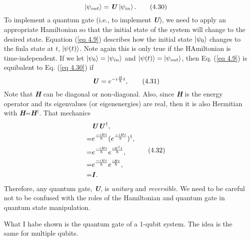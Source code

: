 \documentclass{article}
\begin{document}
\begin{equation} \label{eq 4.30}
    \ket{\psi_{out}}=\textbf{\textit{U}}\ket{\psi_{in}}.\tag{4.30}
\end{equation}
To implement a quantum gate (i.e., to implement \textbf{\textit{U}}), we need to apply an appropriate Hamiltonian
so that the initial state of the system will change to the 
desired state. Equation (\ref{eq 4.9}) describes how the initial state 
$\ket{\psi_0}$ changes to the finla state at $t$, $\ket{\psi(t)}$. Note again
this is only true if the HAmiltonian is time-independent.
If we let $\ket{\psi_0}=\ket{\psi_{in}}$ and $\ket{\psi(t)}=\ket{\psi_{out}}$,
then Eq. (\ref{eq 4.9}) is equibalent to Eq. (\ref{eq 4.30}) if
\begin{equation} \label{eq 4.31}
    \textbf{\textit{U}}=e^{-i\frac{H}{\hbar}t},\tag{4.31}
\end{equation}
Note that \textbf{\textit{H}} can be diagonal or non-diagonal. Also, since 
\textbf{\textit{H}} is the energy operator and its eigenvalues (or eigenenergies) are real,
then it is also Hermitian with \textbf{\textit{H}}=\textbf{\textit{H}}$^\dagger$. That mechanics
\begin{align}\label{eq 4.32}
    \begin{split}
        &\textbf{\textit{U}}\textbf{\textit{U}}^\dagger,\\
        =& e^{\frac{-iHt}{\hbar}}(e^{\frac{-iHt}{\hbar}})^\dagger, \\
        =& e^{\frac{-iHt}{\hbar}}e^{\frac{iH^{\dagger}t}{\hbar}},\\
        =& e^{\frac{-iHt}{\hbar}}e^{\frac{iHt}{\hbar}},\\
        =& \textbf{\textit{I}}.
    \end{split}\tag{4.32}
\end{align}
Therefore, any quantum gate, \textbf{\textit{U}}, is \textit{unitary} and \textit{reversible}.
We need to be careful not to be confused with the roles of the Hamiltonian
and quantum gate in quantum state manipulation.

What I habe shown is the quantum gate of a 1-qubit system. The idea is the same for multiple qubits.
\end{document}
